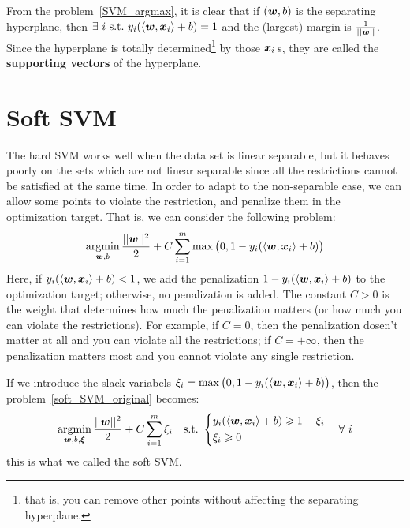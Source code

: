 \begin{re}
    From the problem~\eqref{SVM_argmax}, it is clear that if $(\boldsymbol{w}, b)$ is the separating hyperplane, then
    $\exists~i\ \text{s.t.\ } y_i(\langle\boldsymbol{w}, \boldsymbol{x}_i\rangle + b) = 1$ and the (largest) margin is $\frac{1}{||\boldsymbol{w}||}$.
    Since the hyperplane is totally determined\footnote{that is, you can remove other points without affecting
    the separating hyperplane.} by those $\boldsymbol{x}_i$\,s, they are called the \textbf{supporting vectors} of the
    hyperplane.
\end{re}

\section{Soft SVM}
The hard SVM works well when the data set is linear separable, but it behaves poorly on the sets which are not
linear separable since all the restrictions cannot be satisfied at the same time. In order to adapt to the 
non-separable case, we can allow some points to violate the restriction, and penalize them in the optimization
target. That is, we can consider the following problem:
\begin{equation}\label{soft_SVM_original}
    \operatorname*{argmin}_{\boldsymbol{w}, b} \frac{||\boldsymbol{w}||^2}{2} + C\sum_{i=1}^{m}\max\big(0, 1 - y_i(\langle\boldsymbol{w}, \boldsymbol{x}_i\rangle
    + b)\big)
\end{equation}
Here, if $y_i(\langle\boldsymbol{w}, \boldsymbol{x}_i\rangle + b) < 1$, we add the penalization 
$1 - y_i(\langle\boldsymbol{w}, \boldsymbol{x}_i\rangle +b)$ to the 
optimization target; otherwise, no penalization is added. The constant $C > 0$ is the weight that determines 
how much the penalization matters (or how much you can violate the restrictions). For example, if $C = 0$, 
then the penalization dosen't matter at all and you can violate all the restrictions; if $C = +\infty$, then the 
penalization matters most and you cannot violate any single restriction.\par
If we introduce the slack variabels $\xi_i = \max\big(0, 1 - y_i(\langle\boldsymbol{w}, \boldsymbol{x}_i\rangle +b)\big)$, then
the problem~\eqref{soft_SVM_original} becomes:
\begin{equation}\label{soft_SVM}
    \operatorname*{argmin}_{\boldsymbol{w}, b, \boldsymbol{\xi}} \frac{||\boldsymbol{w}||^2}{2} + C\sum_{i=1}^{m}\xi_i\quad\text{s.t.\ }\left\{
    \begin{aligned}
    & y_i(\langle\boldsymbol{w}, \boldsymbol{x}_i\rangle + b) \geqslant 1 - \xi_i\\
    & \xi_i \geqslant 0 
    \end{aligned}\right.
    \quad\forall~i
\end{equation}
this is what we called the soft SVM\@.

